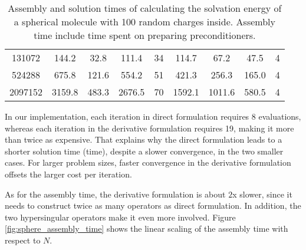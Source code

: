 \begin{table*}[]
\begin{tabular}{c|cccc|cccc}
    131072                                                       & 144.2                                                    & 32.8                                                        & 111.4                                                    & 34            & 114.7                                                    & 67.2                                                        & 47.5                                                     & 4            \\
    524288                                                       & 675.8                                                    & 121.6                                                       & 554.2                                                    & 51            & 421.3                                                    & 256.3                                                       & 165.0                                                    & 4            \\
    2097152                                                      & 3159.8                                                   & 483.3                                                       & 2676.5                                                   & 70            & 1592.1                                                   & 1011.6                                                      & 580.5                                                    & 4           
    \end{tabular}
    \caption{Assembly and solution times of calculating the solvation energy of a spherical molecule with 100 random charges inside.
    Assembly time include time spent on preparing preconditioners.}
    \label{tab:sphere_time}
\end{table*}

In our implementation, each iteration in direct formulation requires $8$ \fmm evaluations, whereas each iteration in the derivative formulation requires 19, making it more than twice as expensive.
That explains why the direct formulation leads to a shorter solution time (\gmres time), despite a slower convergence, in the two smaller cases.
For larger problem sizes, faster convergence in the derivative formulation offsets the larger cost per iteration.

As for the assembly time, the derivative formulation is about $2$x slower, since it needs to construct twice as many operators as direct formulation.
In addition, the two hypersingular operators make it even more involved.
Figure \ref{fig:sphere_assembly_time} shows the linear scaling of the assembly time with respect to $N$.


